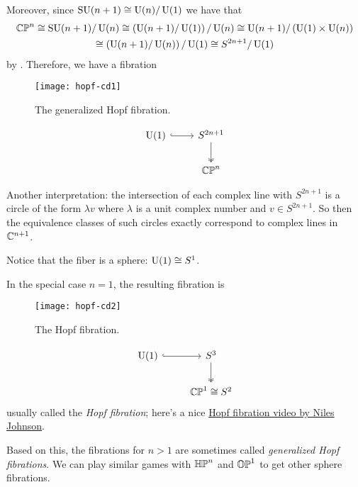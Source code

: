 \begin{example}
	Moreover, since $\operatorname{SU}(n+1) \cong \operatorname{U}(n)/\operatorname{U}(1)$ we have that
	\begin{multline*}
		\mathbb{CP}^n \cong \operatorname{SU}(n+1)/\operatorname{U}(n) \cong \left(\operatorname{U}(n+1)/\operatorname{U}(1)\right)/\operatorname{U}(n) \cong \operatorname{U}(n+1)/\left(\operatorname{U}(1) \times \operatorname{U}(n)\right) \\
		\cong \left(\operatorname{U}(n+1)/\operatorname{U}(n)\right)/\operatorname{U}(1) \cong S^{2n+1}/\operatorname{U}(1)
	\end{multline*}
	by . Therefore, we have a fibration
	\ifplastex
	\begin{figure}[htbp]
		\centering
			\texttt{[image: hopf-cd1]}
		\caption{The generalized Hopf fibration.}
		\label{fig:hopf-cd1}
	\end{figure}
	\else	
		\[
			\begin{tikzcd}
				\U(1)  \arrow[r,hook] & S^{2n+1} \arrow[d,two heads] \\
				 & \CP^n 
			\end{tikzcd}
		\]
	\fi
	
	Another interpretation: the intersection of each complex line with $S^{2n+1}$ is a circle of the form $\lambda v$ where $\lambda$ is a unit complex number and $v \in S^{2n+1}$. So then the equivalence classes of such circles exactly correspond to complex lines in $\mathbb{C}^{n+1}$.
	
	Notice that the fiber is a sphere: $\operatorname{U}(1) \cong S^1$.
	
	In the special case $n=1$, the resulting fibration is 
	\ifplastex
	\begin{figure}[htbp]
		\centering
			\texttt{[image: hopf-cd2]}
		\caption{The Hopf fibration.}
		\label{fig:hopf-cd2}
	\end{figure}
	\else	
		\[
			\begin{tikzcd}
				\U(1)  \arrow[r,hook] & S^{3} \arrow[d,two heads] \\
				 & \CP^1 \cong S^2 
			\end{tikzcd}
		\]
	\fi
	usually called the \emph{Hopf fibration}; here's a nice \href{https://nilesjohnson.net/hopf.html}{Hopf fibration video by Niles Johnson}.
	
	Based on this, the fibrations for $n > 1$ are sometimes called \emph{generalized Hopf fibrations}. We can play similar games with $\mathbb{HP}^n$ and $\mathbb{OP}^1$ to get other sphere fibrations.
\end{example}

